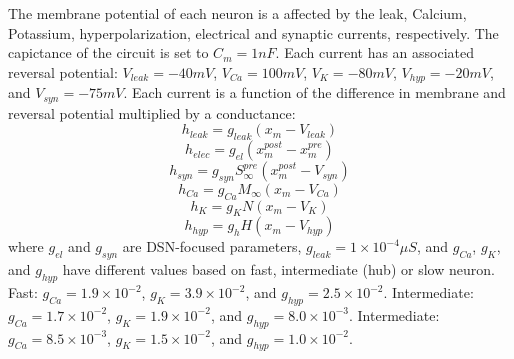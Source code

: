 \documentclass[11pt]{article}
\begin{document}
The membrane potential of each neuron is a affected by the leak, Calcium, Potassium, hyperpolarization,
electrical and synaptic currents, respectively.  The capictance of the circuit is set to $C_m = 1nF$. Each current has an associated reversal potential: $V_{leak} = -40mV$, $V_{Ca} = 100mV$, $V_K = -80mV$, $V_{hyp} = -20mV$, and $V_{syn} = -75mV$. Each current is a function of the
difference in membrane and reversal potential multiplied by a conductance:
\begin{equation}  h_{leak} = g_{leak} (x_m - V_{leak}) 
\end{equation} 
\begin{equation}  h_{elec} = g_{el} (x_m^{post} - x_m^{pre})
\end{equation} 
\begin{equation}  h_{syn} = g_{syn} S_\infty^{pre} (x_m^{post} - V_{syn}) \end{equation} 
\begin{equation}  h_{Ca} = g_{Ca} M_\infty (x_m - V_{Ca}) 
\end{equation} 
\begin{equation}  h_K = g_K N (x_m - V_K) 
\end{equation} 
\begin{equation}  h_{hyp} = g_h H(x_m - V_{hyp})
\end{equation} 
where $g_{el}$ and $g_{syn}$ are DSN-focused parameters, $g_{leak} = 1 \times 10^{-4} \mu S$, and $g_{Ca}$, $g_{K}$, and $g_{hyp}$ have different values based on fast, intermediate (hub) or slow neuron.  Fast: $g_{Ca} = 1.9 \times 10^{-2}$, $ g_K = 3.9 \times 10^{-2} $, and $ g_{hyp} = 2.5 \times 10^{-2} $.  Intermediate: $g_{Ca} = 1.7 \times 10^{-2}$, $ g_K = 1.9 \times 10^{-2} $, and $ g_{hyp} = 8.0 \times 10^{-3} $.  Intermediate: $g_{Ca} = 8.5 \times 10^{-3}$, $ g_K = 1.5 \times 10^{-2} $, and $ g_{hyp} = 1.0 \times 10^{-2} $.
\end{document}
